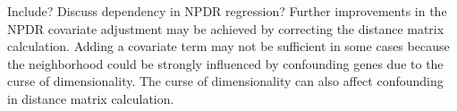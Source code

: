 \documentclass[10pt]{article}
\begin{document}
Include? Discuss dependency in NPDR regression? Further improvements in the NPDR covariate adjustment may be achieved by correcting the distance matrix calculation. Adding a covariate term may not be sufficient in some cases because the neighborhood could be strongly influenced by confounding genes due to the curse of dimensionality. The curse of dimensionality can also affect confounding in distance matrix calculation.



%

\end{document}
